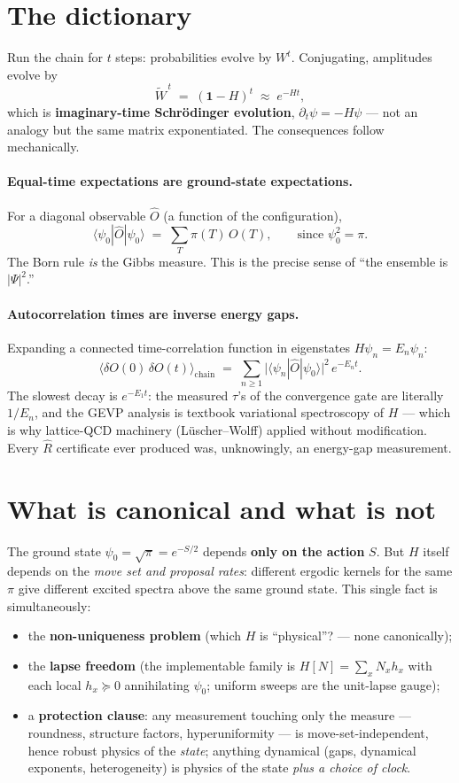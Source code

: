 \documentclass[11pt]{article}
\newcommand{\Wt}{\widetilde W}
\newcommand{\ket}[1]{|#1\rangle}
\newcommand{\bra}[1]{\langle #1|}
\begin{document}
\section{The dictionary}

Run the chain for $t$ steps: probabilities evolve by $W^t$. Conjugating, amplitudes
evolve by
\[
\Wt^{\,t} \;=\; (\mathbf{1} - H)^t \;\approx\; e^{-Ht},
\]
which is \textbf{imaginary-time Schr\"odinger evolution}, $\partial_t \psi = -H\psi$ ---
not an analogy but the same matrix exponentiated. The consequences follow mechanically.

\paragraph{Equal-time expectations are ground-state expectations.}
For a diagonal observable $\hat O$ (a function of the configuration),
\[
\bra{\psi_0}\hat O\ket{\psi_0} \;=\; \sum_T \pi(T)\, O(T),
\qquad\text{since } \psi_0^2 = \pi .
\]
The Born rule \emph{is} the Gibbs measure. This is the precise sense of ``the ensemble
is $|\Psi|^2$.''

\paragraph{Autocorrelation times are inverse energy gaps.}
Expanding a connected time-correlation function in eigenstates
$H\psi_n = E_n\psi_n$:
\[
\big\langle \delta O(0)\,\delta O(t) \big\rangle_{\text{chain}}
\;=\; \sum_{n\ge 1} \big|\bra{\psi_n}\hat O\ket{\psi_0}\big|^2\, e^{-E_n t}.
\]
The slowest decay is $e^{-E_1 t}$: the measured $\tau$'s of the convergence gate are
literally $1/E_n$, and the GEVP analysis is textbook variational spectroscopy of $H$
--- which is why lattice-QCD machinery (L\"uscher--Wolff) applied without modification.
Every $\widehat R$ certificate ever produced was, unknowingly, an energy-gap
measurement.

\section{What is canonical and what is not}

The ground state $\psi_0 = \sqrt\pi = e^{-S/2}$ depends \textbf{only on the action}
$S$. But $H$ itself depends on the \emph{move set and proposal rates}: different
ergodic kernels for the same $\pi$ give different excited spectra above the same ground
state. This single fact is simultaneously:
\begin{itemize}
\item the \textbf{non-uniqueness problem} (which $H$ is ``physical''? --- none
canonically);
\item the \textbf{lapse freedom} (the implementable family is
$H[N] = \sum_x N_x h_x$ with each local $h_x \succeq 0$ annihilating $\psi_0$; uniform
sweeps are the unit-lapse gauge);
\item a \textbf{protection clause}: any measurement touching only the measure ---
roundness, structure factors, hyperuniformity --- is move-set-independent, hence robust
physics of the \emph{state}; anything dynamical (gaps, dynamical exponents,
heterogeneity) is physics of the state \emph{plus a choice of clock}.
\end{itemize}
\end{document}
